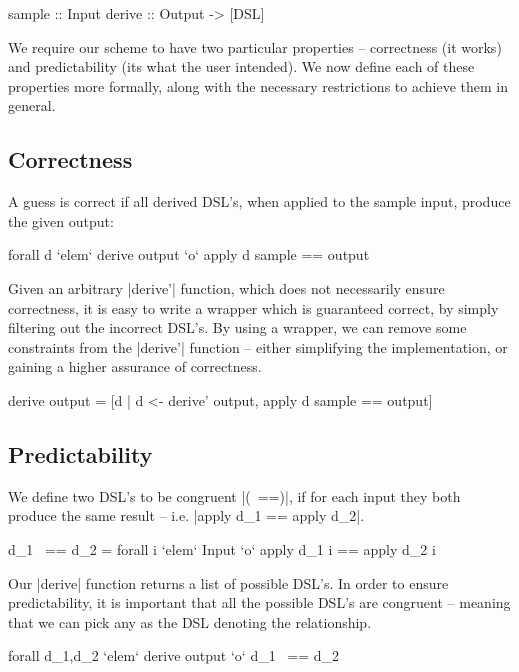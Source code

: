 \documentclass[preprint,draft]{sigplanconf}
\begin{document}
\begin{code}
sample :: Input
derive :: Output -> [DSL]
\end{code}

We require our scheme to have two particular properties -- correctness (it works) and predictability (its what the user intended). We now define each of these properties more formally, along with the necessary restrictions to achieve them in general.

\subsection{Correctness}
\label{sec:correctness}

A guess is correct if all derived DSL's, when applied to the sample input, produce the given output:

\ignore\begin{code}
forall d `elem` derive output `o` apply d sample == output
\end{code}

Given an arbitrary |derive'| function, which does not necessarily ensure correctness, it is easy to write a wrapper which is guaranteed correct, by simply filtering out the incorrect DSL's. By using a wrapper, we can remove some constraints from the |derive'| function -- either simplifying the implementation, or gaining a higher assurance of correctness.

\begin{code}
derive output =
    [d | d <- derive' output, apply d sample == output]
\end{code}

\subsection{Predictability}

We define two DSL's to be congruent |(~==)|, if for each input they both produce the same result -- i.e. |apply d_1 == apply d_2|.

\ignore\begin{code}
d_1 ~== d_2 = forall i `elem` Input `o` apply d_1 i == apply d_2 i
\end{code}

Our |derive| function returns a list of possible DSL's. In order to ensure predictability, it is important that all the possible DSL's are congruent -- meaning that we can pick any as the DSL denoting the relationship.

\ignore\begin{code}
forall d_1,d_2 `elem` derive output `o` d_1 ~== d_2
\end{code}
\end{document}
